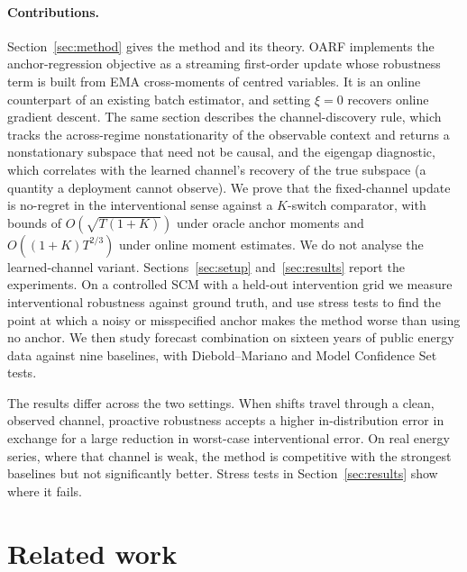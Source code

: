 \documentclass[11pt]{article}
\theoremstyle{plain}
\theoremstyle{remark}
\newcommand{\OARF}{\textsc{OARF}}
\begin{document}
\paragraph{Contributions.}
Section~\ref{sec:method} gives the method and its theory. \OARF{} implements the
anchor-regression objective as a streaming first-order update whose robustness term
is built from EMA cross-moments of centred variables. It is an online counterpart of
an existing batch estimator, and setting $\xi=0$ recovers online gradient descent.
The same section describes the channel-discovery rule, which tracks the
across-regime nonstationarity of the observable context and returns a
nonstationary subspace that need not be causal, and the eigengap diagnostic, which
correlates with the learned channel's recovery of the true subspace (a quantity a
deployment cannot observe). We prove that the fixed-channel update is no-regret in
the interventional sense against a $K$-switch comparator, with bounds of
$O(\sqrt{T(1+K)})$ under oracle anchor moments and $O((1{+}K)T^{2/3})$ under online
moment estimates. We do not analyse the learned-channel variant.
Sections~\ref{sec:setup} and~\ref{sec:results} report the experiments. On a
controlled SCM with a held-out intervention grid we measure interventional
robustness against ground truth, and use stress tests to find the point at which a
noisy or misspecified anchor makes the method worse than using no anchor. We then
study forecast combination on sixteen years of public energy data against nine baselines, with Diebold--Mariano \citep{diebold1995dm} and Model Confidence Set
\citep{hansen2011mcs} tests.

\noindent The results differ across the two settings. When shifts travel through a
clean, observed channel, proactive robustness accepts a higher in-distribution
error in exchange for a large reduction in worst-case interventional error. On real
energy series, where that channel is weak, the method is competitive with the
strongest baselines but not significantly better. Stress tests in
Section~\ref{sec:results} show where it fails.

\section{Related work}\label{sec:related}
\end{document}
